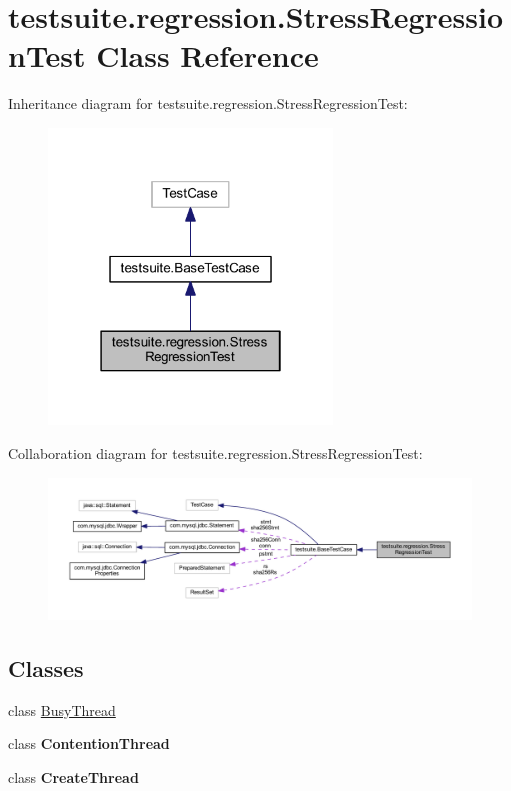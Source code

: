 \hypertarget{classtestsuite_1_1regression_1_1_stress_regression_test}{}\section{testsuite.\+regression.\+Stress\+Regression\+Test Class Reference}
\label{classtestsuite_1_1regression_1_1_stress_regression_test}


Inheritance diagram for testsuite.\+regression.\+Stress\+Regression\+Test\+:
\nopagebreak
\begin{figure}[H]
\begin{center}
\leavevmode
\includegraphics[width=214pt]{classtestsuite_1_1regression_1_1_stress_regression_test__inherit__graph}
\end{center}
\end{figure}


Collaboration diagram for testsuite.\+regression.\+Stress\+Regression\+Test\+:
\nopagebreak
\begin{figure}[H]
\begin{center}
\leavevmode
\includegraphics[width=350pt]{classtestsuite_1_1regression_1_1_stress_regression_test__coll__graph}
\end{center}
\end{figure}
\subsection*{Classes}
\begin{DoxyCompactItemize}
\item 
class \mbox{\hyperlink{classtestsuite_1_1regression_1_1_stress_regression_test_1_1_busy_thread}{Busy\+Thread}}
\item 
class {\bfseries Contention\+Thread}
\item 
class {\bfseries Create\+Thread}
\end{DoxyCompactItemize}
